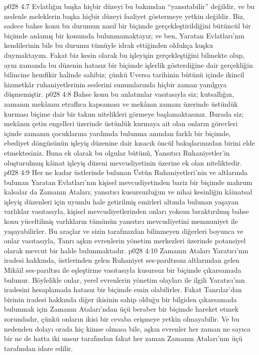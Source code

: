 \vs p028 4:7 Evlatlığın başka hiçbir düzeyi bu bakımdan “yansıtabilir” değildir, ve bu nedenle meleklerin başka hiçbir düzeyi faaliyet göstermeye yetkin değildir. Biz, sadece bahse konu bu durumun nasıl bir biçimde gerçekleştirildiğini bütüncül bir biçimde anlamış bir konumda bulunmamaktayız; ve ben, Yaratan Evlatları’nın kendilerinin bile bu durumu tümüyle idrak ettiğinden oldukça kuşku duymaktayım. Fakat biz kesin olarak bu işleyişin gerçekleştiğini bilmekte olup, aynı zamanda bu düzenin hatasız bir biçimde işlerlik gösterdiğine dair gerçekliğin bilincine hemfikir halinde sahibiz; çünkü Uversa tarihinin bütünü içinde ikincil hizmetkâr ruhaniyetlerinin seslerini sunumlarında hiçbir zaman yanılgıya düşmemiştir.
\vs p028 4:8 Bahse konu bu anlatımlar vasıtasıyla siz; kutsallığın, zamanın mekânını etraflıca kapsaması ve mekânın zamanı üzerinde üstünlük kurması biçime dair bir takım nitelikleri görmeye başlamaktasınız. Burada siz; mekânın çetin engelleri üzerinde üstünlük kurmaya ait olan onların görevleri içinde zamanın çocuklarına yardımda bulunma anından farklı bir biçimde, ebediyet döngüsünün işleyiş düzenine dair kısacık öncül bakışlarınızdan birini elde etmektesiniz. Buna ek olarak bu olgular bütünü, Yansıtıcı Ruhaniyetler’in oluşturulmuş kâinat işleyiş düzeni mevcudiyetinin üzerine ek olan niteliktedir.
\vs p028 4:9 Her ne kadar üstlerinde bulunan Üstün Ruhaniyetleri’nin ve altlarında bulunan Yaratan Evlatları’nın kişisel mevcudiyetinden bariz bir biçimde mahrum kalsalar da Zamanın Ataları; yansıtıcı kusursuzluğun ve nihai kesinliğin kâinatsal işleyiş düzenleri için uyumlu hale getirilmiş emirleri altında bulunan yaşayan varlıklar vasıtasıyla, kişisel mevcudiyetlerinden onları yoksun bıraktırılmış bahse konu yüceltilmiş varlıkların tümünün yansıtıcı mevcudiyetini memnuniyet ile yaşayabilirler. Bu araçlar ve sizin tarafınızdan bilinmeyen diğerleri boyunca ve onlar vasıtasıyla, Tanrı aşkın evrenlerin yönetim merkezleri üzerinde potansiyel olarak mevcut bir halde bulunmaktadır.
\vs p028 4:10 Zamanın Ataları Yaratıcı’nın iradesi hakkında, üstlerinden gelen Ruhaniyet ses\hyp{}parıltısını altlarından gelen Mikâil ses\hyp{}parıltısı ile eşleştirme vasıtasıyla kusursuz bir biçimde çıkarsamada bulunur. Böylelikle onlar, yerel evrenlerin yönetim olayları ile ilgili Yaratıcı’nın iradesini hesaplamada hatasız bir biçimde emin olabilirler. Fakat Tanrılar’dan birinin iradesi hakkında diğer ikisinin sahip olduğu bir bilgiden çıkarsamada bulunmak için Zamanın Ataları’ndan üçü beraber bir biçimde hareket etmek zorundadır, çünkü onların ikisi bir cevaba erişmeye yetkin olmayabilir. Ve bu nedenden dolayı orada hiç kimse olmasa bile, aşkın evrenler her zaman ne sayıca bir ne de hatta iki unsur tarafından fakat her zaman Zamanın Ataları’nın üçü tarafından idare edilir.
